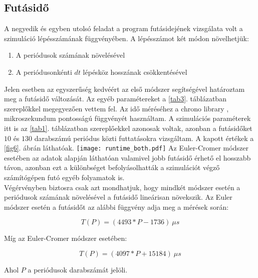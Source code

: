 \begin{multicols}{2}
\subsection{Futásidő}
A negyedik és egyben utolsó feladat a program futásidejének vizsgálata volt a szimuláció lépésszámának függvényében. A lépésszámot két módon növelhetjük:

\begin{enumerate}
    \item A periódusok számának növelésével
    \item A periódusonkénti $dt$ lépésköz hosszának csökkentésével
\end{enumerate}
Jelen esetben az egyszerűség kedvéért az első módszer segítségével határoztam meg a futásidő változását. Az egyéb paramétereket a \ref{tab3}. táblázatban szereplőkkel megegyezően vettem fel. Az idő méréséhez a chrono library  , mikroszekundum pontosságú függvényét használtam. A szimulációs paraméterek itt is az \ref{tab1}. táblázatban szereplőekkel azonosak voltak, azonban a futásidőket $10$ és $130$ darabszámú periódus közti futtatásokra vizsgáltam. A kapott értékek a \ref{fig6}. ábrán láthatóak.
\hfill \break \hfill \break
{\centering\texttt{[image: runtime\_both.pdf]}}
\label{fig6}
\hfill \break \hfill \break
Az Euler-Cromer módszer esetében az adatok alapján láthatóan valamivel jobb futásidő érhető el hosszabb távon, azonban ezt a különbséget befolyásolhatták a szimulációt végző számítógépen futó egyéb folyamatok is. \\
Végérvényben biztosra csak azt mondhatjuk, hogy mindkét módszer esetén a periódusok számának növelésével a futásidő lineárisan növekszik. Az Euler módszer esetén a futásidőt az alábbi függvény adja meg a mérések során:

\begin{equation}
    T \left( P \right) = \left( 4493 * P - 1736 \right)\ \mu s
\end{equation}

Míg az Euler-Cromer módszer esetében:

\begin{equation}
    T \left( P \right) = \left( 4097 * P + 15184 \right)\ \mu s
\end{equation}

Ahol $P$ a periódusok darabszámát jelöli.


\end{multicols}
